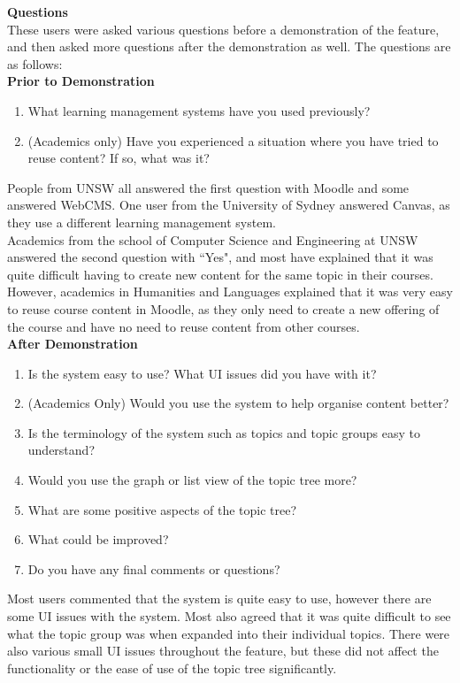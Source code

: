 \textbf{Questions} \\
These users were asked various questions before a demonstration of the feature, and then asked more questions after the demonstration as well. The questions are as follows:\\
\textbf{Prior to Demonstration}
\begin{enumerate}
    \item What learning management systems have you used previously?
    \item (Academics only) Have you experienced a situation where you have tried to reuse content? If so, what was it?
\end{enumerate}

People from UNSW all answered the first question with Moodle and some answered WebCMS. One user from the University of Sydney answered Canvas, as they use a different learning management system.\\
Academics from the school of Computer Science and Engineering at UNSW answered the second question with ``Yes", and most have explained that it was quite difficult having to create new content for the same topic in their courses. However, academics in Humanities and Languages explained that it was very easy to reuse course content in Moodle, as they only need to create a new offering of the course and have no need to reuse content from other courses.\\

\textbf{After Demonstration}
\begin{enumerate}
    \item Is the system easy to use? What UI issues did you have with it?
    \item (Academics Only) Would you use the system to help organise content better?
    \item Is the terminology of the system such as topics and topic groups easy to understand?
    \item Would you use the graph or list view of the topic tree more?
    \item What are some positive aspects of the topic tree?
    \item What could be improved?
    \item Do you have any final comments or questions?
\end{enumerate}

Most users commented that the system is quite easy to use, however there are some UI issues with the system. Most also agreed that it was quite difficult to see what the topic group was when expanded into their individual topics. There were also various small UI issues throughout the feature, but these did not affect the functionality or the ease of use of the topic tree significantly. \\

